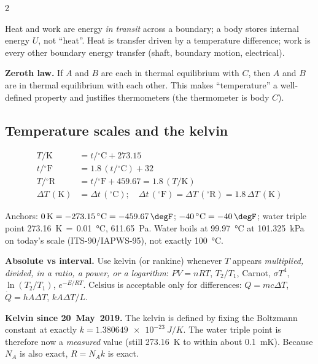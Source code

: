 \begin{multicols}{2}
\begin{keybox}Heat and work are energy \emph{in transit} across a boundary; a body stores internal energy $U$, not ``heat''. Heat is transfer driven by a temperature difference; work is every other boundary energy transfer (shaft, boundary motion, electrical).\end{keybox}

\textbf{Zeroth law.} If $A$ and $B$ are each in thermal equilibrium with $C$, then $A$ and $B$ are in thermal equilibrium with each other. This makes ``temperature'' a well-defined property and justifies thermometers (the thermometer is body $C$).

\subsection{Temperature scales and the kelvin}\label{sec:tscales}
\CORE{}
\begin{formulabox}
\vspace{-6pt}
\begin{align}
T/\mathrm{K} &= t/{}^\circ\mathrm{C} + 273.15 \label{F:temp:CK}\\
t/{}^\circ\mathrm{F} &= 1.8\,(t/{}^\circ\mathrm{C}) + 32 \label{F:temp:CF}\\
T/{}^\circ\mathrm{R} &= t/{}^\circ\mathrm{F} + 459.67 = 1.8\,(T/\mathrm{K}) \label{F:temp:R}\\
\Delta T\,(\mathrm{K}) &= \Delta t\,({}^\circ\mathrm{C});\quad \Delta t\,({}^\circ\mathrm{F})=\Delta T\,({}^\circ\mathrm{R}) = 1.8\,\Delta T\,(\mathrm{K}) \label{F:temp:interval}
\end{align}
\end{formulabox}
Anchors: $0\,\mathrm{K}=\SI{-273.15}{\celsius}=\SI{-459.67}{\degF}$; $\SI{-40}{\celsius}=\SI{-40}{\degF}$; water triple point \SI{273.16}{K}\,$=$\,\SI{0.01}{\celsius}, \SI{611.65}{Pa}. Water boils at \SI{99.97}{\celsius} at \SI{101.325}{kPa} on today's scale (ITS-90/IAPWS-95), not exactly \SI{100}{\celsius}.

\textbf{Absolute vs interval.} Use kelvin (or rankine) whenever $T$ appears \emph{multiplied, divided, in a ratio, a power, or a logarithm}: $PV=nRT$, $T_2/T_1$, Carnot, $\sigma T^4$, $\ln(T_2/T_1)$, $e^{-E/RT}$. Celsius is acceptable only for differences: $Q=mc\Delta T$, $\dot Q=hA\Delta T$, $kA\Delta T/L$.

\textbf{Kelvin since 20~May~2019.} The kelvin is defined by fixing the Boltzmann constant at exactly $k=\SI{1.380649e-23}{J/K}$. The water triple point is therefore now a \emph{measured} value (still \SI{273.16}{K} to within about \SI{0.1}{mK}). Because $N_A$ is also exact, $R=N_Ak$ is exact.


\end{multicols}
